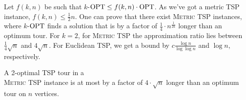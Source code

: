 \documentclass[../skript.tex]{subfiles}
\begin{document}
Let $f(k, n)$ be such that $k$-$\operatorname{OPT} \leq f(k, n) \cdot \operatorname{OPT}$. As we've got a metric TSP instance, $f(k, n) \leq \frac{1}{2} n$.
One can prove that there exist \textsc{Metric TSP} instances, where $k$-$\operatorname{OPT}$ finds a solution that is by a factor of $\frac{1}{4} \cdot n^{\frac{1}{2k}}$ longer than an optimum tour.
For $k = 2$, for \textsc{Metric TSP} the approximation ratio lies between $\frac{1}{4} \sqrt{n}$ and $4 \sqrt{n}$. For Euclidean TSP, we get a bound by $c \frac{\log n}{\log \log n}$ and $\log n$, respectively.
\begin{theorem} %
\label{thm:89}
A 2-optimal TSP tour in a \\\textsc{Metric TSP} instance is at most by a factor of $4 \cdot \sqrt{n}$ longer than an optimum tour on $n$ vertices.
\end{theorem}
\end{document}
